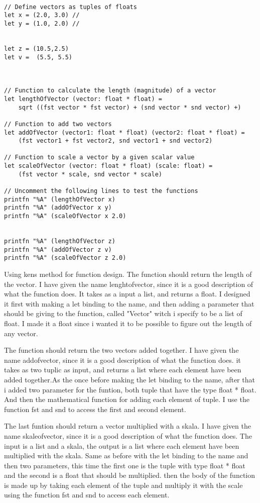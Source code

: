 \documentclass{article}
\begin{document}
    \begin{lstlisting}

// Define vectors as tuples of floats
let x = (2.0, 3.0) // 
let y = (1.0, 2.0) // 


let z = (10.5,2.5)
let v =  (5.5, 5.5)



// Function to calculate the length (magnitude) of a vector
let lengthOfVector (vector: float * float) = 
    sqrt ((fst vector * fst vector) + (snd vector * snd vector) +)

// Function to add two vectors
let addOfVector (vector1: float * float) (vector2: float * float) = 
    (fst vector1 + fst vector2, snd vector1 + snd vector2)

// Function to scale a vector by a given scalar value
let scaleOfVector (vector: float * float) (scale: float) = 
    (fst vector * scale, snd vector * scale)

// Uncomment the following lines to test the functions
printfn "%A" (lengthOfVector x)      
printfn "%A" (addOfVector x y)       
printfn "%A" (scaleOfVector x 2.0)   


printfn "%A" (lengthOfVector z)      
printfn "%A" (addOfVector z v)       
printfn "%A" (scaleOfVector z 2.0)   

    \end{lstlisting}


Using kens method for function design. The function should return the length of the vector. I have given the name lenghtofvector, since it is a good description of what the function does. It takes as a input a list, and returns a float. I designed it first with making a let binding to the name, and then adding a parameter that should be giving to the function, called "Vector" witch i specify to be a list of float. I made it a float since i wanted it to be possible to figure out the length of any vector.

The function should return the two vectors added together. I have given the name addofvector, since it is a good description of what the function does. it takes as two  tuplic as input, and returns a list where each element have been added together.As the once before making the let binding to the name, after that i added two parameter for the funtion, both tuple that have the type float * float. And then the mathematical function for adding each element of tuple. I use the function fst and snd to access the first and second element.

The last funtion should return a vector multiplied with a skala. I have given the name skaleofvector, since it is a good description of what the function does. The input is a list and a skala, the output is a list where each element have been multiplied with the skala. Same as before with the let binding to the name and then two parameters, this time the first one is the tuple with type float * float and the second is a float that should be multiplied. then the body of the function is made up by taking each element of the tuple and multiply it with the scale using the function fst and snd to access each element.
\end{document}
